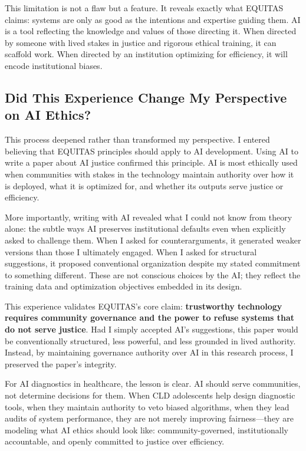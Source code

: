 \documentclass[12pt,a4paper]{article}
\begin{document}
This limitation is not a flaw but a feature. It reveals exactly what EQUITAS claims: systems are only as good as the intentions and expertise guiding them. AI is a tool reflecting the knowledge and values of those directing it. When directed by someone with lived stakes in justice and rigorous ethical training, it can scaffold work. When directed by an institution optimizing for efficiency, it will encode institutional biases.

\subsection{Did This Experience Change My Perspective on AI Ethics?}

This process deepened rather than transformed my perspective. I entered believing that EQUITAS principles should apply to AI development. Using AI to write a paper about AI justice confirmed this principle. AI is most ethically used when communities with stakes in the technology maintain authority over how it is deployed, what it is optimized for, and whether its outputs serve justice or efficiency.

More importantly, writing with AI revealed what I could not know from theory alone: the subtle ways AI preserves institutional defaults even when explicitly asked to challenge them. When I asked for counterarguments, it generated weaker versions than those I ultimately engaged. When I asked for structural suggestions, it proposed conventional organization despite my stated commitment to something different. These are not conscious choices by the AI; they reflect the training data and optimization objectives embedded in its design.

This experience validates EQUITAS's core claim: \textbf{trustworthy technology requires community governance and the power to refuse systems that do not serve justice}. Had I simply accepted AI's suggestions, this paper would be conventionally structured, less powerful, and less grounded in lived authority. Instead, by maintaining governance authority over AI in this research process, I preserved the paper's integrity.

For AI diagnostics in healthcare, the lesson is clear. AI should serve communities, not determine decisions for them. When CLD adolescents help design diagnostic tools, when they maintain authority to veto biased algorithms, when they lead audits of system performance, they are not merely improving fairness---they are modeling what AI ethics should look like: community-governed, institutionally accountable, and openly committed to justice over efficiency.
\end{document}
